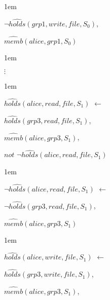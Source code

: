 \documentclass[global,twocolumn,final]{svjour}
\newenvironment{vexample}
  {\begin{example}\hspace{0.25em}}
  {\end{example}}
\newenvironment{vquote}
  {\begin{list}{}{\leftmargin 1em}\item[]}
  {\end{list}}
\begin{document}
\begin{vexample}
\begin{enumerate}
\begin{vquote}
                \hspace{1em}
                $\lnot \hat{holds}(grp1, write, file, S_{0})$,

                \hspace{1em}
               $\hat{memb}(alice, grp1, S_{0})$
              \end{vquote}

              \begin{vquote}
                \hspace{2em}$\vdots$
              \end{vquote}

              \begin{vquote}
                $\hat{holds}(alice, read, file, S_{1})$ $\leftarrow$

                \hspace{1em}
                $\hat{holds}(grp3, read, file, S_{1})$,

                \hspace{1em}
                $\hat{memb}(alice, grp3, S_{1})$,

                \hspace{1em}
                $not$ $\lnot\hat{holds}(alice, read, file, S_{1})$
              \end{vquote}

              \begin{vquote}
                $\lnot\hat{holds}(alice, read, file, S_{1})$ $\leftarrow$

                \hspace{1em}
                $\lnot\hat{holds}(grp3, read, file, S_{1})$,

                \hspace{1em}
                $\hat{memb}(alice, grp3, S_{1})$
              \end{vquote}

              \begin{vquote}
                $\hat{holds}(alice, write, file, S_{1})$ $\leftarrow$

                \hspace{1em}
                $\hat{holds}(grp3, write, file, S_{1})$,

                \hspace{1em}
                $\hat{memb}(alice, grp3, S_{1})$,


\end{vquote}
\end{enumerate}
\end{vexample}
\end{document}
